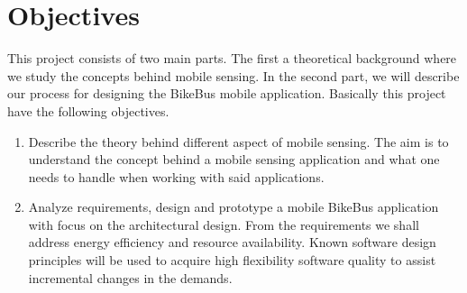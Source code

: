 \section{Objectives}


            
    
    

This project consists of two main parts. The first a theoretical background where we study the concepts behind mobile sensing. In the second part, we will describe our process for designing the BikeBus mobile application. Basically this project have the following objectives. 

\begin{enumerate}
    \item   Describe the theory behind different aspect of mobile sensing. The aim is to understand the concept behind a mobile sensing application and what one needs to handle when working with said applications. 
            
    \item  Analyze requirements, design and prototype a mobile BikeBus application with focus on the architectural design. From the requirements we shall address energy efficiency and resource availability. Known software design principles will be used to acquire high flexibility software quality to assist incremental changes in the demands. 

\end{enumerate}


